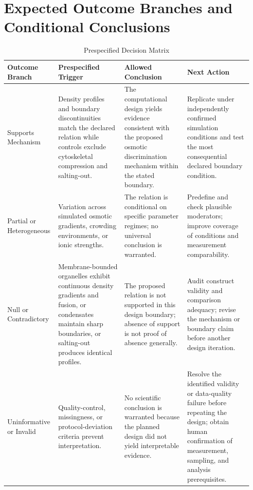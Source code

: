 \documentclass[conference]{IEEEtran}
\begin{document}
\section{Expected Outcome Branches and Conditional Conclusions}
\begin{table}[htbp]
\centering
\footnotesize
\setlength{\tabcolsep}{3pt}
\renewcommand{\arraystretch}{1.12}
\caption{Prespecified Decision Matrix}
\label{tab:expected-outcomes-outcome-decision-matrix}
\begin{tabular}{|p{}|p{}|p{}|p{}|}
\hline
Outcome Branch & Prespecified Trigger & Allowed Conclusion & Next Action \\\hline
Supports Mechanism & Density profiles and boundary discontinuities match the declared relation while controls exclude cytoskeletal compression and salting-out. & The computational design yields evidence consistent with the proposed osmotic discrimination mechanism within the stated boundary. & Replicate under independently confirmed simulation conditions and test the most consequential declared boundary condition. \\\hline
Partial or Heterogeneous & Variation across simulated osmotic gradients, crowding environments, or ionic strengths. & The relation is conditional on specific parameter regimes; no universal conclusion is warranted. & Predefine and check plausible moderators; improve coverage of conditions and measurement comparability. \\\hline
Null or Contradictory & Membrane-bounded organelles exhibit continuous density gradients and fusion, or condensates maintain sharp boundaries, or salting-out produces identical profiles. & The proposed relation is not supported in this design boundary; absence of support is not proof of absence generally. & Audit construct validity and comparison adequacy; revise the mechanism or boundary claim before another design iteration. \\\hline
Uninformative or Invalid & Quality-control, missingness, or protocol-deviation criteria prevent interpretation. & No scientific conclusion is warranted because the planned design did not yield interpretable evidence. & Resolve the identified validity or data-quality failure before repeating the design; obtain human confirmation of measurement, sampling, and analysis prerequisites. \\\hline
\end{tabular}
\end{table}~\cite{cite_42ed299a53990c06,cite_7161cfcb40366dd0,cite_099ed712535e9d67,cite_8d46403814b99258,cite_3222d2eeb7add195,cite_3480a6462f7a2d86,cite_06a078fea514798a,cite_90e000f6b0c99ee8}
\end{document}
